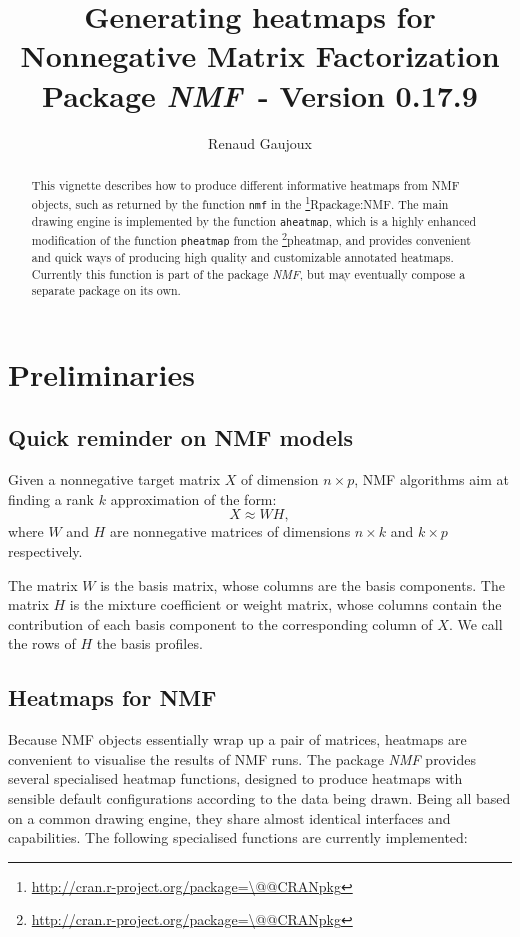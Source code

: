 \documentclass[a4paper]{article}\usepackage[]{graphicx}\usepackage[]{color}
\makeatletter
\let\code=\texttt
\newcommand{\pkgname}[1]{\textit{#1}\xspace}
\newcommand{\CRANurl}[1]{\url{http://cran.r-project.org/package=#1}}
\def\CRANpkg{\@ifstar\@CRANpkg\@@CRANpkg}
\def\@CRANpkg#1{\href{http://cran.r-project.org/package=#1}{\pkgname{#1}}\footnote{\CRANurl{#1}}}
\def\@@CRANpkg#1{\href{http://cran.r-project.org/package=#1}{\pkgname{#1}} package\footnote{\CRANurl{#1}}}
\def\citeCRANpkg{\@ifstar\@citeCRANpkg\@@citeCRANpkg}
\def\@citeCRANpkg#1{\CRANpkg{#1}\cite*{Rpackage:#1}}
\def\@@citeCRANpkg#1{\CRANpkg{#1}~\cite{Rpackage:#1}}
\newcommand{\nmfpack}{\pkgname{NMF}}
\renewcommand{\cite}[1]{\parencite{#1}}
\makeatother
\begin{document}
\title{Generating heatmaps for Nonnegative Matrix Factorization\\
\small Package \nmfpack\ - Version 0.17.9}
\author{Renaud Gaujoux}

\maketitle

\begin{abstract}
This vignette describes how to produce different informative heatmaps from NMF objects, 
such as returned by the function \code{nmf} in the \citeCRANpkg{NMF}.
The main drawing engine is implemented by the function \code{aheatmap}, which is 
a highly enhanced modification of the function \code{pheatmap} from the \CRANpkg{pheatmap},
and provides convenient and quick ways of producing high quality and customizable annotated heatmaps.
Currently this function is part of the package \nmfpack, but may eventually 
compose a separate package on its own.
\end{abstract}

{\small \tableofcontents}

\section{Preliminaries}

\subsection{Quick reminder on NMF models}

Given a nonnegative target matrix $X$ of dimension $n\times p$, NMF algorithms 
aim at finding a rank $k$ approximation of the form:
$$
X \approx W H,
$$
where $W$ and $H$ are nonnegative matrices of dimensions $n\times k$ and $k\times p$ 
respectively.

The matrix $W$ is the basis matrix, whose columns are the basis components.
The matrix $H$ is the mixture coefficient or weight matrix, whose columns contain 
the contribution of each basis component to the corresponding column of $X$.
We call the rows of $H$ the basis profiles.

\subsection{Heatmaps for NMF}

Because NMF objects essentially wrap up a pair of matrices, heatmaps are convenient 
to visualise the results of NMF runs. 
The package \nmfpack provides several specialised heatmap functions, designed to produce 
heatmaps with sensible default configurations according to the data being drawn.
Being all based on a common drawing engine, they share almost identical interfaces 
and capabilities.
The following specialised functions are currently implemented:
\end{document}
